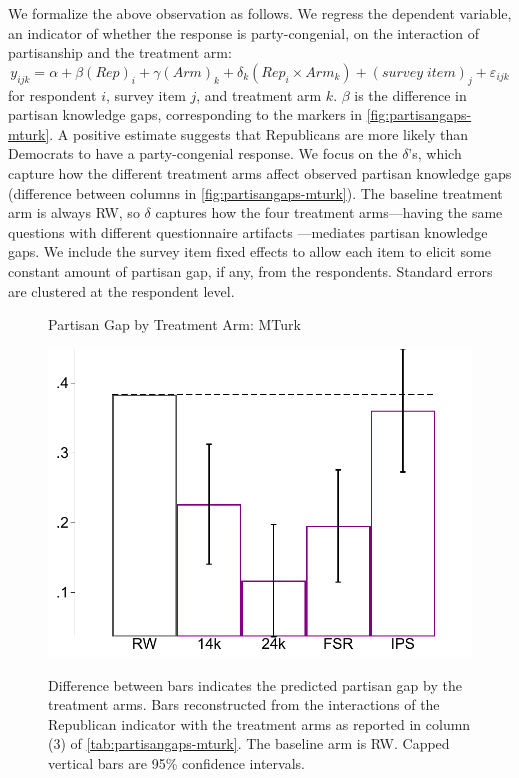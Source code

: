 \documentclass[12pt, letterpaper]{article}
\begin{document}
We formalize the above observation as follows. We regress the dependent variable, an indicator of whether the response is party-congenial, on the interaction of partisanship and the treatment arm:
\begin{equation}\label{eq:partisangap-mturk}
y_{ijk} = \alpha + \beta (Rep)_i + \gamma (Arm)_k + \delta_k (Rep_i \times Arm_k) + (survey \; item)_j + \varepsilon_{ijk}
\end{equation}
for respondent $i$, survey item $j$, and treatment arm $k$. $\beta$ is the difference in partisan knowledge gaps, corresponding to the markers in \cref{fig:partisangaps-mturk}. A positive estimate suggests that Republicans are more likely than Democrats to have a party-congenial response. We focus on the $\delta$'s, which capture how the different treatment arms affect observed partisan knowledge gaps (difference between columns in \cref{fig:partisangaps-mturk}). The baseline treatment arm is always RW, so $\delta$ captures how the four treatment arms---having the same questions with different questionnaire artifacts ---mediates partisan knowledge gaps.
We include the survey item fixed effects to allow each item to elicit some constant amount of partisan gap, if any, from the respondents. Standard errors are clustered at the respondent level.

\begin{figure}[t]
	\centering
	\caption{Partisan Gap by Treatment Arm: MTurk}
	\includegraphics[width=.55\textwidth]{../figs/mturk-pgag-surveyarms.pdf}
	\label{fig:partisangaps-mturk-reg}
	\caption*{\footnotesize 
		Difference between bars indicates the predicted partisan gap by the treatment arms. 
		Bars reconstructed from the interactions of the Republican indicator with the treatment arms as reported in column (3) of \cref{tab:partisangaps-mturk}.
		The baseline arm is RW.
		Capped vertical bars are 95\% confidence intervals.
	}
\end{figure}
\end{document}
